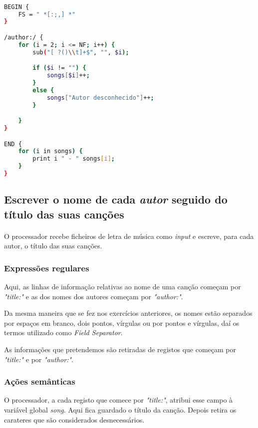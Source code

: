 \documentclass{article}
\begin{document}
\begin{lstlisting}[language=bash]

BEGIN {
	FS = " *[:;,] *"
}

/author:/ {
	for (i = 2; i <= NF; i++) {
		sub("[ ?()\\t]+$", "", $i);

		if ($i != "") {
			songs[$i]++;
		}
		else {
			songs["Autor desconhecido"]++;
		}

	}
}

END {
	for (i in songs) {
		print i " - " songs[i];
	}
}

\end{lstlisting}


\subsection{Escrever o nome de cada \emph{autor} seguido do título das suas canções}

\paragraph{} O processador recebe ficheiros de letra de música como \emph{input} e escreve, para cada autor, o título das suas canções.

\subsubsection{Expressões regulares}

Aqui, as linhas de informação relativas ao nome de uma canção começam por   \emph{"title:"} e as dos nomes dos autores começam por \emph{"author:"}.

Da mesma maneira que se fez nos exercícios anteriores, os nomes estão separados por espaços em branco, dois pontos, vírgulas ou por pontos e vírgulas, daí os termos utilizado como \emph{Field Separator}.

As informações que pretendemos são retiradas de registos que começam por \emph{"title:"} e por \emph{"author:"}.

\subsubsection{Ações semânticas}

O processador, a cada registo que comece por \emph{"title:"}, atribui esse campo à variável global \emph{song}. Aqui fica guardado o título da canção. Depois retira os carateres que são considerados desnecessários.
\end{document}
